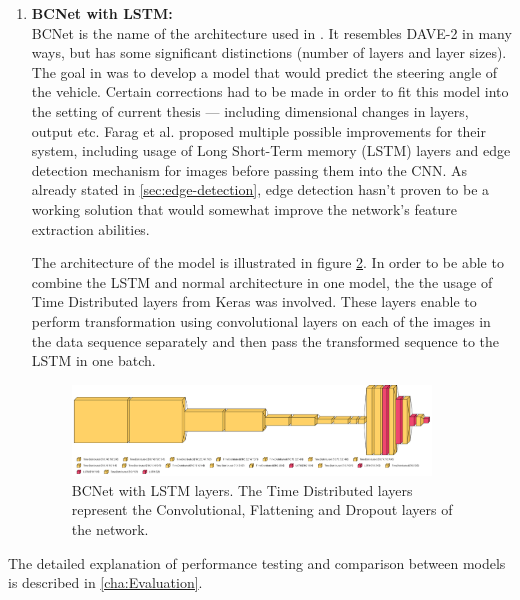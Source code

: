 \begin{enumerate}
\begin{figure}[htbp]
      \caption{DAVE-2 architecture.}
      \label{fig:dave-2-arch}
    \end{figure}
  \item \textbf{BCNet with LSTM:} \\
    BCNet is the name of the architecture used in \autocite{8855753}. It resembles DAVE-2 in many ways, but has some significant distinctions (number of layers and layer sizes). The goal in \autocite{8855753} was to develop a model that would predict the steering angle of the vehicle. Certain corrections had to be made in order to fit this model into the setting of current thesis --- including dimensional changes in layers, output etc. Farag et al. \autocite{8855753} proposed multiple possible improvements for their system, including usage of Long Short-Term memory (LSTM) layers and edge detection mechanism for images before passing them into the CNN. As already stated in \autoref{sec:edge-detection}, edge detection hasn't proven to be a working solution that would somewhat improve the network's feature extraction abilities.

    The architecture of the model is illustrated in figure \ref{fig:BCNet-LSTM-arch}. In order to be able to combine the LSTM and normal architecture in one model, the the usage of Time Distributed layers from Keras was involved. These layers enable to perform transformation using convolutional layers on each of the images in the data sequence separately and then pass the transformed sequence to the LSTM in one batch.
    \begin{figure}[htbp]
      \centering
      \includegraphics[width=0.9\textwidth]{Images/BCNetLSTM_architecture.png}
      \caption{BCNet with LSTM layers. The Time Distributed layers represent the Convolutional, Flattening and Dropout layers of the network.}
      \label{fig:BCNet-LSTM-arch}
    \end{figure}
\end{enumerate}

The detailed explanation of performance testing and comparison between models is described in \autoref{cha:Evaluation}.

